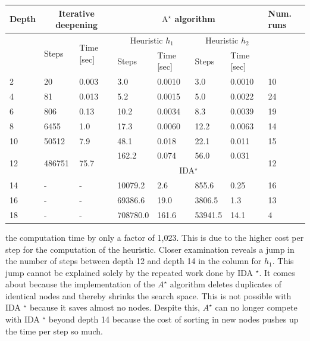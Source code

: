 \documentclass[10pt]{book}
\begin{document}
\begin{center}
\begin{tabular}{|l|l|l|l|l|l|l|l|}
\hline
\multirow[t]{3}{*}{Depth} & \multicolumn{2}{|c|}{Iterative deepening} & \multicolumn{4}{|c|}{$\mathrm{A}^{\star}$ algorithm} & \multirow[t]{3}{*}{Num. runs} \\
\hline
 & \multirow[t]{2}{*}{Steps} & \multirow{2}{*}{Time [sec]} & \multicolumn{2}{|c|}{Heuristic $h_{1}$} & \multicolumn{2}{|c|}{Heuristic $h_{2}$} &  \\
\hline
 &  &  & Steps & Time [sec] & Steps & Time [sec] &  \\
\hline
2 & 20 & 0.003 & 3.0 & 0.0010 & 3.0 & 0.0010 & 10 \\
\hline
4 & 81 & 0.013 & 5.2 & 0.0015 & 5.0 & 0.0022 & 24 \\
\hline
6 & 806 & 0.13 & 10.2 & 0.0034 & 8.3 & 0.0039 & 19 \\
\hline
8 & 6455 & 1.0 & 17.3 & 0.0060 & 12.2 & 0.0063 & 14 \\
\hline
10 & 50512 & 7.9 & 48.1 & 0.018 & 22.1 & 0.011 & 15 \\
\hline
\multirow[t]{2}{*}{12} & \multirow[t]{2}{*}{486751} & \multirow[t]{2}{*}{75.7} & 162.2 & 0.074 & 56.0 & 0.031 & \multirow[t]{2}{*}{12} \\
\hline
 &  &  & \multicolumn{4}{|c|}{IDA$^{\star}$} &  \\
\hline
14 & - & - & 10079.2 & 2.6 & 855.6 & 0.25 & 16 \\
\hline
16 & - & - & 69386.6 & 19.0 & 3806.5 & 1.3 & 13 \\
\hline
18 & - & - & 708780.0 & 161.6 & 53941.5 & 14.1 & 4 \\
\hline
\end{tabular}
\end{center}

the computation time by only a factor of 1,023. This is due to the higher cost per step for the computation of the heuristic.
Closer examination reveals a jump in the number of steps between depth 12 and depth 14 in the column for $h_{1}$. This jump cannot be explained solely by the repeated work done by IDA ${ }^{\star}$. It comes about because the implementation of the $A^{\star}$ algorithm deletes duplicates of identical nodes and thereby shrinks the search space. This is not possible with IDA ${ }^{\star}$ because it saves almost no nodes. Despite this, $A^{\star}$ can no longer compete with IDA ${ }^{\star}$ beyond depth 14 because the cost of sorting in new nodes pushes up the time per step so much.
\end{document}
